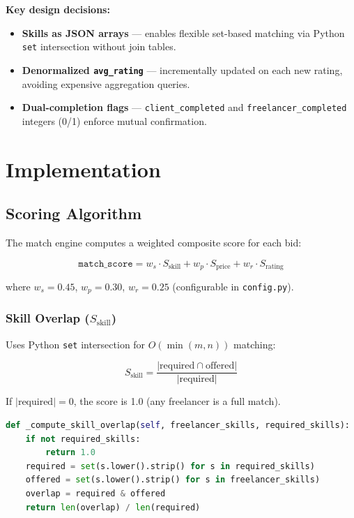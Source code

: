 \documentclass[12pt, a4paper]{report}
\begin{document}
\textbf{Key design decisions:}
\begin{itemize}
  \item \textbf{Skills as JSON arrays} --- enables flexible set-based matching via Python \texttt{set} intersection without join tables.
  \item \textbf{Denormalized \texttt{avg\_rating}} --- incrementally updated on each new rating, avoiding expensive aggregation queries.
  \item \textbf{Dual-completion flags} --- \texttt{client\_completed} and \texttt{freelancer\_completed} integers (0/1) enforce mutual confirmation.
\end{itemize}

\chapter{Implementation}

\section{Scoring Algorithm}

The match engine computes a weighted composite score for each bid:

\begin{equation}
  \texttt{match\_score} = w_s \cdot S_{\text{skill}} + w_p \cdot S_{\text{price}} + w_r \cdot S_{\text{rating}}
\end{equation}

where $w_s = 0.45$, $w_p = 0.30$, $w_r = 0.25$ (configurable in \texttt{config.py}).

\subsection{Skill Overlap ($S_{\text{skill}}$)}

Uses Python \texttt{set} intersection for $O(\min(m, n))$ matching:

\begin{equation}
  S_{\text{skill}} = \frac{|\text{required} \cap \text{offered}|}{|\text{required}|}
\end{equation}

If $|\text{required}| = 0$, the score is 1.0 (any freelancer is a full match).

\begin{lstlisting}[caption={Skill overlap computation}, language=Python]
def _compute_skill_overlap(self, freelancer_skills, required_skills):
    if not required_skills:
        return 1.0
    required = set(s.lower().strip() for s in required_skills)
    offered = set(s.lower().strip() for s in freelancer_skills)
    overlap = required & offered
    return len(overlap) / len(required)
\end{lstlisting}
\end{document}
